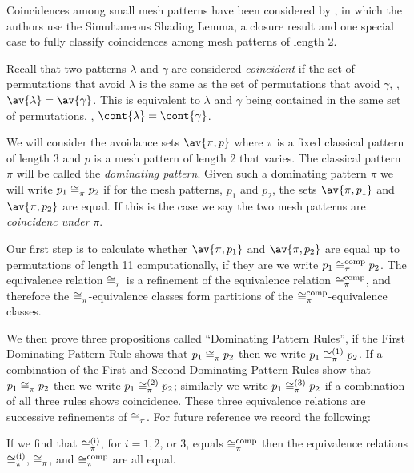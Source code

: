 Coincidences among small mesh patterns have been considered by
\textcite{DBLP:journals/corr/ClaessonTU14}, in which the authors use the
Simultaneous Shading Lemma, a closure result and one special case to fully
classify coincidences among mesh patterns of length 2.

Recall that two patterns \(\lambda\) and \(\gamma\) are considered
\emph{coincident} if the set of permutations that avoid \(\lambda\) is the same
as the set of permutations that avoid \(\gamma\), \ie, \(\av{\lambda} =
\av{\gamma}\). This is equivalent to \(\lambda\) and \(\gamma\) being contained
in the same set of permutations, \ie, \(\cont{\lambda} = \cont{\gamma}\).

We will consider the avoidance sets \(\av{\pi,p}\) where \(\pi\) is a fixed
classical pattern of length 3 and \(p\) is a mesh pattern of length 2 that
varies. The classical pattern \(\pi\) will be called the \emph{dominating
pattern}. Given such a dominating pattern \(\pi\) we will write \(p_1
\coinc{\pi} p_2\) if for the mesh patterns, \(p_1\) and \(p_2\),  the sets
\(\av{\pi,p_1}\) and \(\av{\pi,p_2}\) are equal. If this is the case we say
the two mesh patterns are \emph{coincidenc under} \(\pi\).

Our first step is to calculate whether \(\av{\pi,p_1}\) and \(\av{\pi,p_2}\) are
equal up to permutations of length 11 computationally, if they are we write
\(p_1 \coinc[comp]{\pi} p_2\). The equivalence relation \(\coinc{\pi}\) is a
refinement of the equivalence relation \(\coinc[comp]{\pi}\), and therefore the
\(\coinc{\pi}\)-equivalence classes form partitions of the
\(\coinc[comp]{\pi}\)-equivalence classes.

We then prove three propositions called ``Dominating Pattern Rules'', if the
First Dominating Pattern Rule shows that \(p_1 \coinc{\pi} p_2\) then we write
\(p_1 \coinc[(1)]{\pi} p_2\). If a combination of the First and Second
Dominating Pattern Rules show that \(p_1 \coinc{\pi} p_2\) then we write
\(p_1 \coinc[(2)]{\pi} p_2\); similarly we write \(p_1 \coinc[(3)]{\pi} p_2\) if
a combination of all three rules shows coincidence. These three equivalence
relations are successive refinements of \(\coinc{\pi}\). For future reference
we record the following:

\begin{note}
\label{note:main}
    If we find that \(\coinc[(i)]{\pi}\), for \(i = 1, 2\), or \(3\), equals
    \(\coinc[comp]{\pi}\) then the equivalence relations \(\coinc[(i)]{\pi}\),
    \(\coinc{\pi}\), and \(\coinc[comp]{\pi}\) are all equal.
\end{note}

